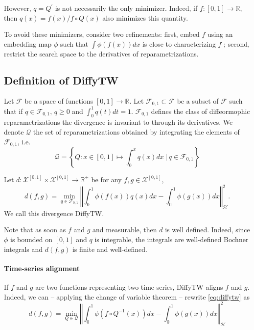However, $q=Q^\prime$ is not necessarily the only minimizer. Indeed, if $f:[0,1] \to \mathbb R$, then $q(x) = f(x) / f\circ Q(x)$ also minimizes this quantity.

To avoid these minimizers, consider two refinements: first, embed $f$ using an embedding map $\phi$ such that $\int \phi(f(x))dx$ is close to characterizing $f$ ; second, restrict the search space to the derivatives of reparametrizations.

\subsection{Definition of DiffyTW}

Let $\mathcal F$ be a space of functions $[0, 1] \to \mathbb R$. Let $\mathcal F_{0,1} \subset \mathcal F$ be a subset of $\mathcal F$ such that if $q\in\mathcal F_{0,1}$, $q\geq 0$ and $\int_0^1q(t)dt =1$. $\mathcal F_{0,1}$ defines the class of diffeormophic reparametrizations the divergence is invariant to through its derivatives. We denote $\mathcal Q$ the set of reparametrizations obtained by integrating the elements of $\mathcal F_{0,1}$, i.e.
\begin{equation}
    \mathcal Q = \left\lbrace Q: x\in[0,1] \mapsto \int_0^x q(x)dx ~\vert~ q \in \mathcal F_{0,1}\right\rbrace
\end{equation}

\begin{definition}[DiffyTW]\label{def:diffytw}
Let $d: \mathcal X^{[0,1]} \times \mathcal X^{[0,1]} \to \mathbb R^+$ be for any $f, g\in\mathcal X^{[0,1]}$,
\begin{equation}\label{eq:diffytw}
    d(f, g) = \min_{q \in \mathcal F_{0,1}}\left\Vert \int_0^1 \phi(f(x))q(x)dx - \int_0^1\phi(g(x))dx\right\Vert^2_\mathcal H.
\end{equation}
We call this divergence DiffyTW.
\end{definition}

Note that as soon as $f$ and $g$ and measurable, then $d$ is well defined. Indeed, since $\phi$ is bounded on $[0,1]$ and $q$ is integrable, the integrals are well-defined Bochner integrals and $d(f, g)$ is finite and well-defined.

\paragraph{Time-series alignment}
If $f$ and $g$ are two functions representing two time-series, DiffyTW aligns $f$ and $g$. Indeed, we can -- applying the change of variable theorem -- rewrite \cref{eq:diffytw} as
\begin{equation}\label{eq:diffytw-Q}
    d(f, g) = \min_{Q \in \mathcal Q} \left\Vert \int_0^1 \phi(f \circ Q^{-1}(x))dx - \int_0^1\phi(g(x))dx\right\Vert^2_\mathcal H
\end{equation}

